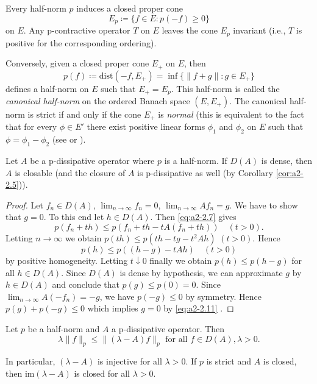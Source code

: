 \begin{remark}\label{rem:a2-2.8}
Every half-norm $p$ induces a closed proper cone 
\[
E_{p} \coloneqq \{f \in E \colon p(-f) \geq 0\}
\] 
on $E$.
Any p-contractive operator $T$ on $E$ leaves the cone $E_{p}$ invariant (i.e., $T$ is positive for the corresponding ordering).

Conversely, given a closed proper cone $E_{+}$ on $E$, then 
\[
p(f) \coloneqq \text{dist}(-f,E_{+}) = \inf\{\|f + g\| \colon g \in E_{+}\}
\]
defines a half-norm on $E$ such that $E_{+} = E_{p}$.
This half-norm is called the \emph{canonical half-norm} on the ordered Banach space $(E,E_{+})$.
The canonical half-norm is strict if and only if the cone $E_{+}$ is \emph{normal} (this is equivalent to the fact that for every $\phi \in E'$ there exist positive linear forms $\phi_{1}$ and $\phi_{2}$ on $E$ such that $\phi = \phi_{1} - \phi_{2}$ (see \citet{battyrobinson:1984} or \citet[Chapter V]{schaefer:1966}).
\end{remark}
\begin{proposition}\label{prop:a2-2.9}
Let $A$ be a p-dissipative operator where $p$ is a half-norm.
If $D(A)$ is dense, then $A$ is closable (and the closure of $A$ is p-dissipative as well (by Corollary \ref{cor:a2-2.5})). 
\end{proposition}

\begin{proof}
Let $f_n \in D(A)$, $\lim_{n \to \infty} f_{n} = 0$, $\lim_{n \to \infty} Af_{n} = g$.
We have to show that $g = 0$.
To this end let $h \in D(A)$.
Then \eqref{eq:a2-2.7}   
gives 
%	
\[
p(f_{n} + th) \leq p(f_{n} + th - tA(f_{n} + th)) \quad (t > 0) .
\]
%
Letting $n \to \infty$ we obtain 
$p(th) \leq p(th - tg - t^{2}Ah)$ \quad $(t > 0)$.
Hence 
\[
p(h) \leq p((h-g) - tAh) \quad (t > 0)
\] 
by positive homogeneity.
Letting $t \downarrow 0$ finally we obtain $p(h) \leq p(h - g)$ for all $h \in D(A)$.
Since $D(A)$ is dense by hypothesis, we can approximate $g$ by $h \in D(A)$ and conclude that $p(g) \leq p(0) = 0$.
Since $\lim_{n\to\infty} A(-f_{n}) = -g$, we have $p(-g) \leq 0$ by symmetry.
Hence $p(g) + p(-g) \leq 0$ which implies $g = 0$ by \eqref{eq:a2-2.11} . 
\end{proof}

\begin{lemma}\label{lem:a2-2.10}
Let $p$ be a half-norm and $A$ a p-dissipative operator.
Then
\begin{equation}\label{eq:a2-2.14}
\lambda\|f\|_{p} \leq \|(\lambda - A)f\|_{p} \text{ for all } f \in D(A), \lambda > 0.
\end{equation}

In particular, $(\lambda-A)$ is injective for all $\lambda > 0$.
If $p$ is strict and $A$ is closed, then $\text{im}(\lambda - A)$ is closed for all $\lambda > 0$.
\end{lemma}

